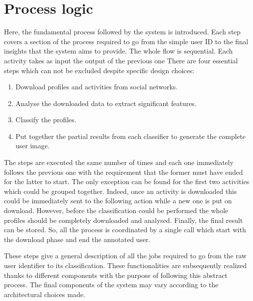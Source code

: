 \section{Process logic}
Here, the fundamental process followed by the system is introduced.
Each step covers a section of the process required to go from the simple user ID to the final insights that the system aims to provide.
The whole flow is sequential. Each activity takes as input the output of the previous one
There are four essential steps which can not be excluded despite specific design choices:
\begin{enumerate}
    \item Download profiles and activities from social networks.
    \item Analyse the downloaded data to extract significant features.
    \item Classify the profiles.
    \item Put together the partial results from each classifier to generate the complete user image.
\end{enumerate}
The steps are executed the same number of times and each one immediately follows the previous one with the requirement that the former must have ended for the latter to start.
The only exception can be found for the first two activities which could be grouped together. Indeed, once an activity is downloaded this could be immediately sent to the following action while a new one is put on download.
However, before the classification could be performed the whole profiles should be completely downloaded and analysed.
Finally, the final result can be stored. So, all the process is coordinated by a single call which start with the download phase and end the annotated user.

These steps give a general description of all the jobs required to go from the raw user identifier to its classification.
These functionalities are subsequently realized thanks to different components with the purpose of following this abstract process.
The final components of the system may vary according to the architectural choices made.

